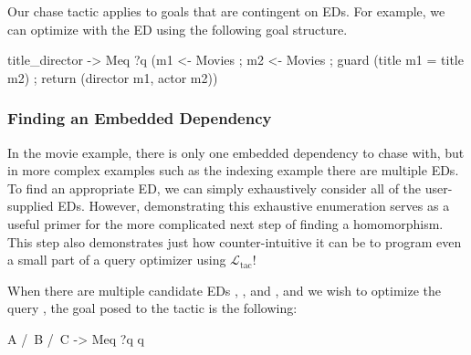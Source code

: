 \documentclass[preprint]{sigplanconf}
\newcommand{\ltac}[0]{\ensuremath{\mathcal{L}_{\mathrm{tac}}}}
\begin{document}
Our chase tactic applies to goals that are contingent on EDs.  For example, we can optimize with the  ED using the following goal structure.
\begin{coq}
title_director ->
Meq ?q
    (m1 <- Movies ; m2 <- Movies ;
     guard (title m1 = title m2) ;
     return (director m1, actor m2))
\end{coq}



\subsubsection{Finding an Embedded Dependency}
\label{sec:traverse-ed}

In the movie example, there is only one embedded dependency to chase with, but in more complex examples such as the indexing example there are multiple EDs.  To find an appropriate ED, we can simply exhaustively consider all of the user-supplied EDs.  However, demonstrating this exhaustive enumeration serves as a useful primer for the more complicated next step of finding a homomorphism.  This step also demonstrates just how counter-intuitive it can be to program even a small part of a query optimizer using \ltac{}!

When there are multiple candidate EDs , , and , and we wish to optimize the query , the goal posed to the tactic is the following:
\begin{coq}
A /\ B /\ C -> Meq ?q q
\end{coq}
\end{document}
